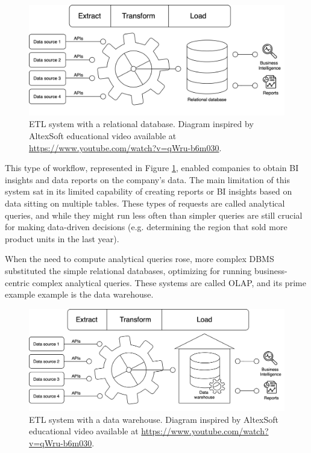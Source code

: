 \begin{figure}[!ht]
    \begin{center}
      \includegraphics[width=\textwidth]{figures/2-background/DeltaLake_evolution-ETL+DB.png}
    \end{center}
    \caption[ETL system with a relational database]{\gls{ETL} system with a relational database. Diagram inspired by AltexSoft educational video available at \url{https://www.youtube.com/watch?v=qWru-b6m030}.}
    \label{fig:ETL+DB}
\end{figure}

This type of workflow, represented in Figure \ref{fig:ETL+DB}, enabled companies to obtain \gls{BI} insights and data reports on the company's data. The main limitation of this system sat in its limited capability of creating reports or \gls{BI} insights based on data sitting on multiple tables. These types of requests are called analytical queries, and while they might run less often than simpler queries are still crucial for making data-driven decisions (e.g. determining the region that sold more product units in the last year).

When the need to compute analytical queries rose, more complex \gls{DBMS} substituted the simple relational databases, optimizing for running business-centric complex analytical queries. These systems are called \gls{OLAP}, and its prime example example is the data warehouse.

\begin{figure}[!ht]
    \begin{center}
      \includegraphics[width=\textwidth]{figures/2-background/DeltaLake_evolution-ETL+DW.png}
    \end{center}
    \caption[ETL system with a data warehouse]{\gls{ETL} system with a data warehouse. Diagram inspired by AltexSoft educational video available at \url{https://www.youtube.com/watch?v=qWru-b6m030}.}
    \label{fig:ETL+DW}
\end{figure}

